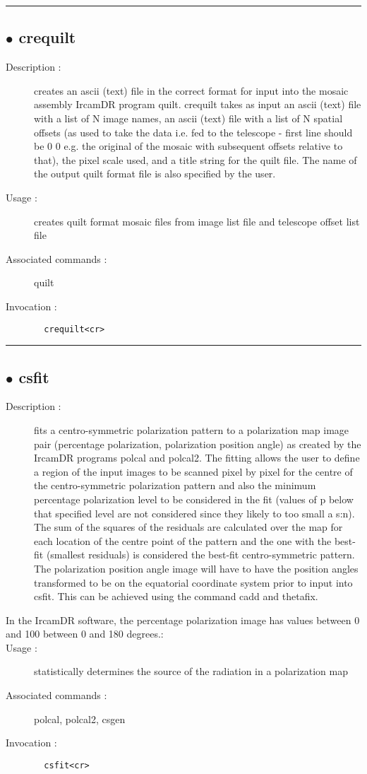 \hrule \subsection*{$\bullet$ crequilt}
\begin{description}
\item[Description :] creates an ascii (text) file in the correct format for input
into the mosaic assembly IrcamDR program quilt.  crequilt takes as input
an ascii (text) file with a list of N image names, an ascii (text) file
with a list of N spatial offsets (as used to take the data i.e. fed to
the telescope - first line should be 0 0 e.g. the original of the mosaic
with subsequent offsets relative to that), the pixel scale used, and a
title string for the quilt file.  The name of the output quilt format
file is also specified by the user.
\item[Usage :] creates quilt format mosaic files from image list file and
telescope offset list file
\item[Associated commands :] quilt
\item[Invocation :]

\verb+  crequilt<cr> +\end{description}

\hrule \subsection*{$\bullet$ csfit}
\begin{description}
\item[Description :] fits a centro-symmetric polarization pattern to a polarization
map image pair (percentage polarization, polarization position angle) as
created by the IrcamDR programs polcal and polcal2.  The fitting allows
the user to define a region of the input images to be scanned pixel by
pixel for the centre of the centro-symmetric polarization pattern and
also the minimum percentage polarization level to be considered in the
fit (values of p below that specified level are not considered since they
likely to too small a s:n).  The sum of the squares of the residuals are
calculated over the map for each location of the centre point of the
pattern and the one with the best-fit (smallest residuals) is considered
the best-fit centro-symmetric pattern.  The polarization position angle
image will have to have the position angles transformed to be on the
equatorial coordinate system prior to input into csfit.  This can be
achieved using the command cadd and thetafix.  
\item[In the IrcamDR software, the percentage polarization image has values
between 0 and 100%
between 0 and 180 degrees.:]
\item[Usage :] statistically determines the source of the radiation in a
polarization map
\item[Associated commands :] polcal, polcal2, csgen
\item[Invocation :]

\verb+  csfit<cr> +\end{description}


